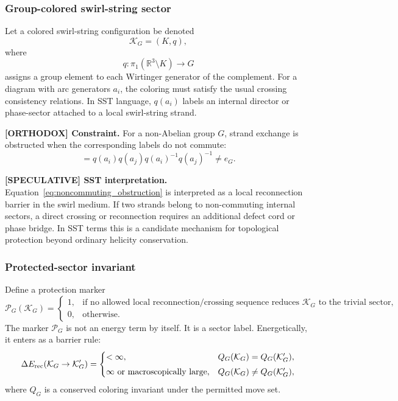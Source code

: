 \subsubsection{Group-colored swirl-string sector}
Let a colored swirl-string configuration be denoted
\begin{equation}
    \mathcal K_G=(K,q),
\end{equation}
where
\begin{equation}
    q: \pi_1\!\left(\mathbb R^3\setminus K\right)\longrightarrow G
    \label{eq:coloring_homomorphism}
\end{equation}
assigns a group element to each Wirtinger generator of the complement. For a diagram with arc generators $a_i$, the coloring must satisfy the usual crossing consistency relations. In SST language, $q(a_i)$ labels an internal director or phase-sector attached to a local swirl-string strand.

\textbf{[ORTHODOX] Constraint.}
For a non-Abelian group $G$, strand exchange is obstructed when the corresponding labels do not commute:
\begin{equation}
    [q(a_i),q(a_j)]
    = q(a_i)q(a_j)q(a_i)^{-1}q(a_j)^{-1}
    \neq e_G.
    \label{eq:noncommuting_obstruction}
\end{equation}

\textbf{[SPECULATIVE] SST interpretation.}
Equation~\eqref{eq:noncommuting_obstruction} is interpreted as a local reconnection barrier in the swirl medium. If two strands belong to non-commuting internal sectors, a direct crossing or reconnection requires an additional defect cord or phase bridge. In SST terms this is a candidate mechanism for topological protection beyond ordinary helicity conservation.

\subsubsection{Protected-sector invariant}
Define a protection marker
\begin{equation}
    \mathcal P_G(\mathcal K_G)=
    \begin{cases}
        1, & \text{if no allowed local reconnection/crossing sequence reduces }\mathcal K_G\text{ to the trivial sector},\\[0.3em]
        0, & \text{otherwise.}
    \end{cases}
    \label{eq:protection_marker}
\end{equation}
The marker $\mathcal P_G$ is not an energy term by itself. It is a sector label. Energetically, it enters as a barrier rule:
\begin{equation}
    \Delta E_{\rm rec}(\mathcal K_G\rightarrow \mathcal K'_G)=
    \begin{cases}
        <\infty, & Q_G(\mathcal K_G)=Q_G(\mathcal K'_G),\\[0.3em]
        \infty \text{ or macroscopically large}, & Q_G(\mathcal K_G)\neq Q_G(\mathcal K'_G),
    \end{cases}
    \label{eq:nonabelian_barrier_rule}
\end{equation}
where $Q_G$ is a conserved coloring invariant under the permitted move set.

